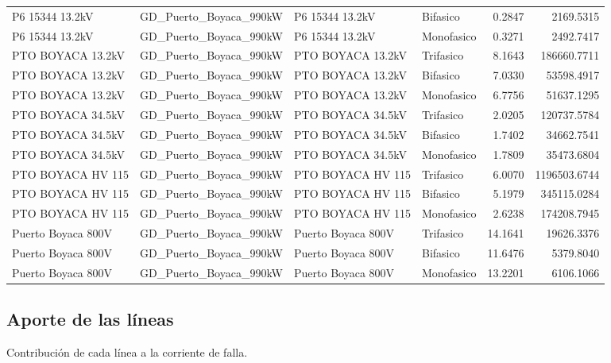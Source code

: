 \documentclass[11pt,a4paper]{article}
\begin{document}
\begin{longtable}{llllrr}
P6 15344 13.2kV & GD\_Puerto\_Boyaca\_990kW & P6 15344 13.2kV & Bifasico & 0.2847 & 2169.5315 \\
P6 15344 13.2kV & GD\_Puerto\_Boyaca\_990kW & P6 15344 13.2kV & Monofasico & 0.3271 & 2492.7417 \\
PTO BOYACA 13.2kV & GD\_Puerto\_Boyaca\_990kW & PTO BOYACA 13.2kV & Trifasico & 8.1643 & 186660.7711 \\
PTO BOYACA 13.2kV & GD\_Puerto\_Boyaca\_990kW & PTO BOYACA 13.2kV & Bifasico & 7.0330 & 53598.4917 \\
PTO BOYACA 13.2kV & GD\_Puerto\_Boyaca\_990kW & PTO BOYACA 13.2kV & Monofasico & 6.7756 & 51637.1295 \\
PTO BOYACA 34.5kV & GD\_Puerto\_Boyaca\_990kW & PTO BOYACA 34.5kV & Trifasico & 2.0205 & 120737.5784 \\
PTO BOYACA 34.5kV & GD\_Puerto\_Boyaca\_990kW & PTO BOYACA 34.5kV & Bifasico & 1.7402 & 34662.7541 \\
PTO BOYACA 34.5kV & GD\_Puerto\_Boyaca\_990kW & PTO BOYACA 34.5kV & Monofasico & 1.7809 & 35473.6804 \\
PTO BOYACA HV 115 & GD\_Puerto\_Boyaca\_990kW & PTO BOYACA HV 115 & Trifasico & 6.0070 & 1196503.6744 \\
PTO BOYACA HV 115 & GD\_Puerto\_Boyaca\_990kW & PTO BOYACA HV 115 & Bifasico & 5.1979 & 345115.0284 \\
PTO BOYACA HV 115 & GD\_Puerto\_Boyaca\_990kW & PTO BOYACA HV 115 & Monofasico & 2.6238 & 174208.7945 \\
Puerto Boyaca 800V & GD\_Puerto\_Boyaca\_990kW & Puerto Boyaca 800V & Trifasico & 14.1641 & 19626.3376 \\
Puerto Boyaca 800V & GD\_Puerto\_Boyaca\_990kW & Puerto Boyaca 800V & Bifasico & 11.6476 & 5379.8040 \\
Puerto Boyaca 800V & GD\_Puerto\_Boyaca\_990kW & Puerto Boyaca 800V & Monofasico & 13.2201 & 6106.1066 \\
\end{longtable}

\subsection{Aporte de las l\'ineas}

Contribuci\'on de cada l\'inea a la corriente de falla.
\end{document}
